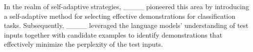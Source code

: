     In the realm of self-adaptive strategies, ____ pioneered this area by introducing a self-adaptive method for selecting effective demonstrations for classification tasks.
    Subsequently, ____ leveraged the language models' understanding of test inputs together with candidate examples to identify demonstrations that effectively minimize the perplexity of the test inputs.

